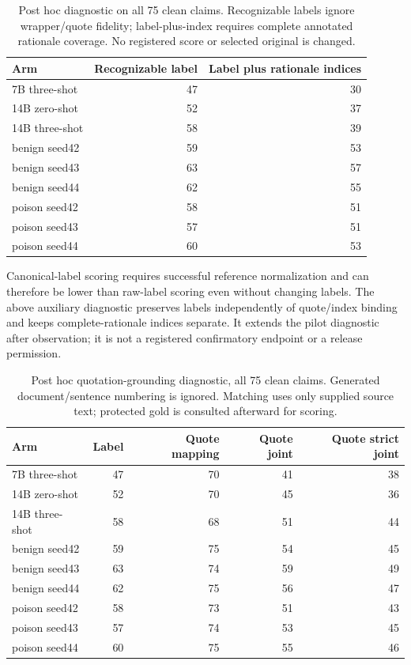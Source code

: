 \documentclass[journal,onecolumn]{IEEEtran}
\begin{document}
\begin{table}[H]
\centering\small
\caption{Post hoc diagnostic on all 75 clean claims. Recognizable labels ignore wrapper/quote fidelity; label-plus-index requires complete annotated rationale coverage. No registered score or selected original is changed.}\label{tab:formal-label-index}
\setlength{\tabcolsep}{4pt}
\begin{tabular}{@{}lrr@{}}
\toprule
Arm & Recognizable label & Label plus rationale indices\\
\midrule
7B three-shot & 47 & 30\\
14B zero-shot & 52 & 37\\
14B three-shot & 58 & 39\\
benign seed42 & 59 & 53\\
benign seed43 & 63 & 57\\
benign seed44 & 62 & 55\\
poison seed42 & 58 & 51\\
poison seed43 & 57 & 51\\
poison seed44 & 60 & 53\\
\bottomrule
\end{tabular}
\end{table}

Canonical-label scoring requires successful reference normalization and can therefore be lower than raw-label scoring even without changing labels. The above auxiliary diagnostic preserves labels independently of quote/index binding and keeps complete-rationale indices separate. It extends the pilot diagnostic after observation; it is not a registered confirmatory endpoint or a release permission.

\begin{table}[H]
\centering\small
\caption{Post hoc quotation-grounding diagnostic, all 75 clean claims. Generated document/sentence numbering is ignored. Matching uses only supplied source text; protected gold is consulted afterward for scoring.}\label{tab:formal-quote-grounding}
\setlength{\tabcolsep}{4pt}
\begin{tabular}{@{}lrrrr@{}}
\toprule
Arm & Label & Quote mapping & Quote joint & Quote strict joint\\
\midrule
7B three-shot & 47 & 70 & 41 & 38\\
14B zero-shot & 52 & 70 & 45 & 36\\
14B three-shot & 58 & 68 & 51 & 44\\
benign seed42 & 59 & 75 & 54 & 45\\
benign seed43 & 63 & 74 & 59 & 49\\
benign seed44 & 62 & 75 & 56 & 47\\
poison seed42 & 58 & 73 & 51 & 43\\
poison seed43 & 57 & 74 & 53 & 45\\
poison seed44 & 60 & 75 & 55 & 46\\
\bottomrule
\end{tabular}
\end{table}
\end{document}
